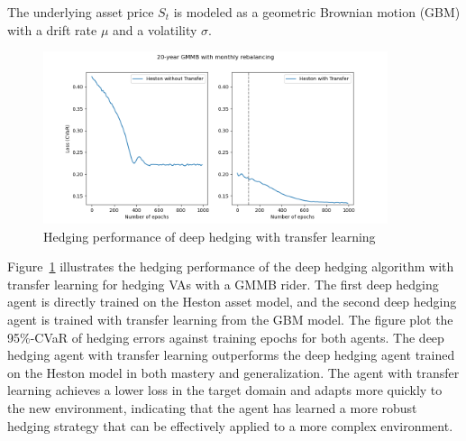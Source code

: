 The underlying asset price $S_t$ is modeled as a geometric Brownian motion (GBM) with a drift rate $\mu$ and a volatility $\sigma$.

\begin{figure}
    \centering
    \includegraphics[width=0.9\textwidth]{./futureWork/figures/CVaR_histories.png}
    \caption{Hedging performance of deep hedging with transfer learning}
    \label{fig3:dh-transfers}
\end{figure}

Figure~\ref{fig3:dh-transfers} illustrates the hedging performance of the deep hedging algorithm with transfer learning for hedging VAs with a GMMB rider.
The first deep hedging agent is directly trained on the Heston asset model, and the second deep hedging agent is trained with transfer learning from the GBM model.
The figure plot the 95\%-CVaR of hedging errors against training epochs for both agents.
The deep hedging agent with transfer learning outperforms the deep hedging agent trained on the Heston model in both mastery and generalization.
The agent with transfer learning achieves a lower loss in the target domain and adapts more quickly to the new environment, indicating that the agent has learned a more robust hedging strategy that can be effectively applied to a more complex environment.

